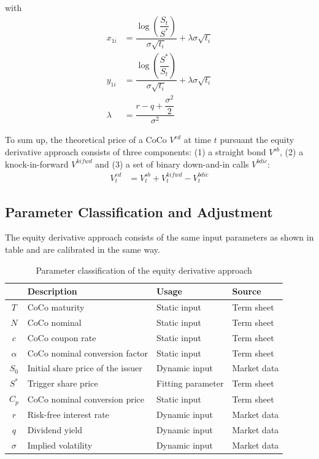 with 
\begin{align*}
x_{1i} &= \dfrac{\log \left( \dfrac{S_t}{S^*} \right)}{\sigma \sqrt{t_i}} + \lambda \sigma \sqrt{t_i}\\
y_{1i} &= \dfrac{\log \left( \dfrac{S^*}{S_t} \right)}{\sigma \sqrt{t_i}} + \lambda \sigma \sqrt{t_i}\\
\lambda &= \dfrac{r-q+\dfrac{\sigma^2}{2}}{\sigma^2}
\end{align*}

To sum up, the theoretical price of a CoCo $V^{ed}$ at time $t$ pursuant the equity derivative approach consists of three components: (1) a straight bond $V^{sb}$, (2) a knock-in-forward $V^{kifwd}$ and (3) a set of binary down-and-in calls $V^{bdic}$:
\begin{align}
V^{ed}_t &= V^{sb}_t + V_t^{kifwd} - V_{t}^{bdic}
\end{align}

\subsection{Parameter Classification and Adjustment}

The equity derivative approach consists of the same input parameters as shown in table \label{equityparameters} and are calibrated in the same way.

\begin{table}[H]
	\setlength{\extrarowheight}{2.5pt}
	\centering
	\begin{tabular}{clll}
		\toprule
			 & \textbf{Description} & \textbf{Usage} & \textbf{Source} \\ 
		\midrule
			$T$ & CoCo maturity & Static input & Term sheet \\
			$N$ & CoCo nominal & Static input & Term sheet \\			
			$c$ & CoCo coupon rate & Static input & Term sheet \\
			$\alpha$ & CoCo nominal conversion factor & Static input & Term sheet \\
			$S_0$ & Initial share price of the issuer & Dynamic input & Market data \\
			$S^*$ & Trigger share price & Fitting parameter & Term sheet \\
			$C_p$ & CoCo nominal conversion price & Static input & Term sheet \\
			$r$ & Risk-free interest rate & Dynamic input & Market data \\
			$q$ & Dividend yield & Dynamic input & Market data\\
			$\sigma$& Implied volatility & Dynamic input & Market data \\
		\bottomrule
	\end{tabular}
	\caption[Parameter classification of the equity derivative approach]{Parameter classification of the equity derivative approach \citep{wilkens2014contingent}}
	\label{equityparameters}
\end{table}

